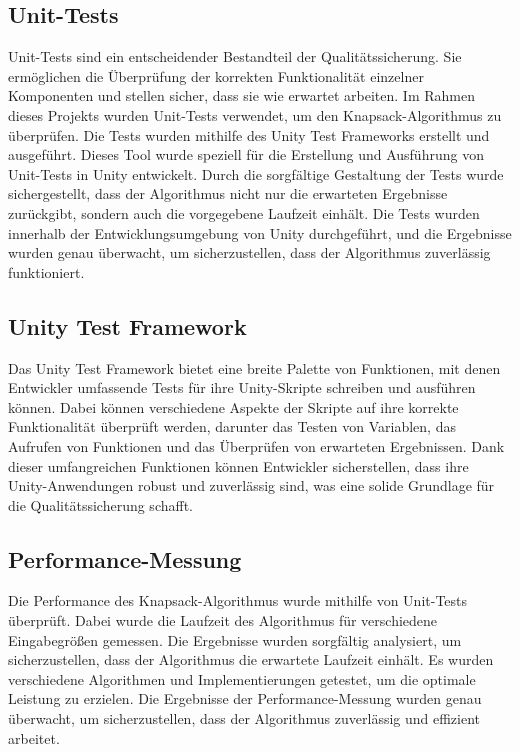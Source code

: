 \subsection{Unit-Tests}
Unit-Tests sind ein entscheidender Bestandteil der Qualitätssicherung. Sie ermöglichen die Überprüfung der korrekten
Funktionalität einzelner Komponenten und stellen sicher, dass sie wie erwartet arbeiten. Im Rahmen dieses Projekts wurden
Unit-Tests verwendet, um den Knapsack-Algorithmus zu überprüfen. Die Tests wurden mithilfe des Unity Test Frameworks
erstellt und ausgeführt. Dieses Tool wurde speziell für die Erstellung und Ausführung von Unit-Tests in Unity entwickelt.
Durch die sorgfältige Gestaltung der Tests wurde sichergestellt, dass der Algorithmus nicht nur die erwarteten Ergebnisse
zurückgibt, sondern auch die vorgegebene Laufzeit einhält. Die Tests wurden innerhalb der Entwicklungsumgebung von Unity
durchgeführt, und die Ergebnisse wurden genau überwacht, um sicherzustellen, dass der Algorithmus zuverlässig funktioniert.

\subsection{Unity Test Framework}
Das Unity Test Framework bietet eine breite Palette von Funktionen, mit denen Entwickler umfassende Tests für ihre
Unity-Skripte schreiben und ausführen können. Dabei können verschiedene Aspekte der Skripte auf ihre korrekte Funktionalität
überprüft werden, darunter das Testen von Variablen, das Aufrufen von Funktionen und das Überprüfen von erwarteten Ergebnissen.
Dank dieser umfangreichen Funktionen können Entwickler sicherstellen, dass ihre Unity-Anwendungen robust und zuverlässig sind,
was eine solide Grundlage für die Qualitätssicherung schafft.

\subsection{Performance-Messung}
Die Performance des Knapsack-Algorithmus wurde mithilfe von Unit-Tests überprüft. Dabei wurde die Laufzeit des Algorithmus
für verschiedene Eingabegrößen gemessen. Die Ergebnisse wurden sorgfältig analysiert, um sicherzustellen, dass der Algorithmus
die erwartete Laufzeit einhält. Es wurden verschiedene Algorithmen und Implementierungen getestet, um die optimale Leistung
zu erzielen. Die Ergebnisse der Performance-Messung wurden genau überwacht, um sicherzustellen, dass der Algorithmus
zuverlässig und effizient arbeitet.

